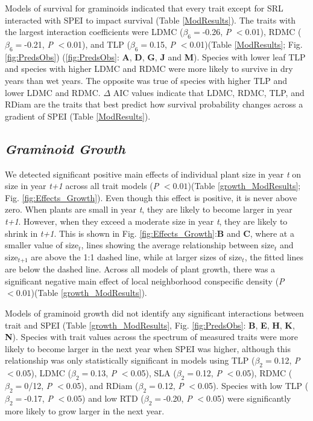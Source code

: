 \documentclass[12pt, letterpaper]{article}
\begin{document}
Models of survival for graminoids indicated that every trait except for SRL interacted with SPEI to impact survival (Table \ref{ModResults}). The traits with the largest interaction coefficients were LDMC ($\beta _6=$-0.26,  \textit{P} $<$0.01), RDMC ($\beta _6=$-0.21,  \textit{P} $<$0.01), and TLP ($\beta _6=$0.15,  \textit{P} $<$0.01)(Table \ref{ModResults}; Fig. \ref{fig:PredsObs}) (\ref{fig:PredsObs}: \textbf{A}, \textbf{D}, \textbf{G}, \textbf{J} and \textbf{M}). Species with lower leaf TLP and species with higher LDMC and RDMC were more likely to survive in dry years than wet years. The opposite was true of species with higher TLP and lower LDMC and RDMC. $\Delta$ AIC values indicate that LDMC, RDMC, TLP, and RDiam are the traits that best predict how survival probability changes across a gradient of SPEI (Table \ref{ModResults}).

\subsection{\textit{Graminoid Growth}} 
We detected significant positive main effects of individual plant size in year \textit{t} on size in year \textit{t+1} across all trait models (\textit{P} $<0.01$)(Table \ref{growth_ModResults}; Fig. \ref{fig:Effects_Growth}). Even though this effect is positive, it is never above zero. When plants are small in year \textit{t}, they are likely to become larger in year \textit{t+1}. However, when they exceed a moderate size in year \textit{t}, they are likely to shrink in \textit{t+1}. This is shown in Fig. \ref{fig:Effects_Growth}:\textbf{B} and \textbf{C}, where at a smaller value of size$_{\textit{t}}$, lines showing the average relationship between size$_{\textit{t}}$ and size$_{\textit{t+1}}$ are above the 1:1 dashed line, while at larger sizes of size$_{\textit{t}}$, the fitted lines are below the dashed line. Across all models of plant growth, there was a significant negative main effect of local neighborhood conspecific density (\textit{P} $<0.01$)(Table \ref{growth_ModResults}).

Models of graminoid growth did not identify any significant interactions between trait and SPEI (Table \ref{growth_ModResults}, Fig. \ref{fig:PredsObs}: \textbf{B}, \textbf{E}, \textbf{H}, \textbf{K}, \textbf{N}). Species with trait values across the spectrum of measured traits were more likely to become larger in the next year when SPEI was higher, although this relationship was only statistically significant in models using TLP ($\beta _2=$0.12,  \textit{P} $<$0.05), LDMC ($\beta _2=$0.13,  \textit{P} $<$0.05), SLA ($\beta _2=$0.12,  \textit{P} $<$0.05), RDMC ($\beta _2=$0/12, \textit{P} $<$0.05), and RDiam ($\beta _2=$0.12,  \textit{P} $<$0.05). Species with low TLP ($\beta _2=$-0.17,  \textit{P} $<$0.05) and low RTD ($\beta _2=$-0.20, \textit{P} $<$0.05) were significantly more likely to grow larger in the next year. 
\end{document}
